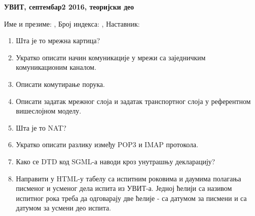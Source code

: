 \documentclass[a4paper]{article}
\begin{document}
\begin{center}
\textbf{УВИТ, септембар2 2016, теоријски део}  
\end{center}
Име и презиме: \hrulefill, Број индекса: \hrulefill, Наставник: \hrulefill
\begin{enumerate}

\item Шта је то мрежна картица?

\hrulefill

\hrulefill

\hrulefill

\item Укратко описати начин комуникације у мрежи са заједничким комуникационим каналом.

\hrulefill

\hrulefill

\hrulefill

\item Описати комутирање порука.

\hrulefill

\hrulefill

\hrulefill

\item Описати задатак мрежног слоја и задатак транспортног слоја у референтном вишеслојном моделу.

\hrulefill

\hrulefill

\hrulefill

\item Шта је то NAT?

\hrulefill

\hrulefill

\hrulefill

\item Укратко описати разлику између POP3 и IMAP протокола.

\hrulefill

\hrulefill

\hrulefill

\item Како се DTD код SGML-а наводи кроз унутрашњу декларацију?

\hrulefill

\hrulefill

\hrulefill

\item Направити у HTML-у табелу са испитним роковима и даумима полагања писменог и усменог дела испита из УВИТ-а. 
Једној ћелији са називом испитног рока треба да одговарају две ћелије - са датумом за писмени и са датумом за усмени део испита.



\end{enumerate}
\end{document}
